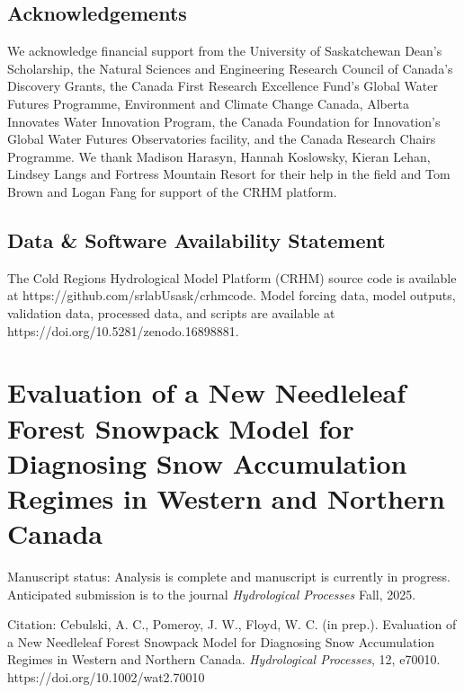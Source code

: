 \documentclass[
  letterpaper,
]{tex/uofsthesis-cs}
\begin{document}
\section{Acknowledgements}\label{acknowledgements}

We acknowledge financial support from the University of Saskatchewan
Dean's Scholarship, the Natural Sciences and Engineering Research
Council of Canada's Discovery Grants, the Canada First Research
Excellence Fund's Global Water Futures Programme, Environment and
Climate Change Canada, Alberta Innovates Water Innovation Program, the
Canada Foundation for Innovation's Global Water Futures Observatories
facility, and the Canada Research Chairs Programme. We thank Madison
Harasyn, Hannah Koslowsky, Kieran Lehan, Lindsey Langs and Fortress
Mountain Resort for their help in the field and Tom Brown and Logan Fang
for support of the CRHM platform.

\section{Data \& Software Availability
Statement}\label{data-software-availability-statement}

The Cold Regions Hydrological Model Platform (CRHM) source code is
available at https://github.com/srlabUsask/crhmcode. Model forcing data,
model outputs, validation data, processed data, and scripts are
available at https://doi.org/10.5281/zenodo.16898881.

\pagebreak


\chapter{Evaluation of a New Needleleaf Forest Snowpack Model for
Diagnosing Snow Accumulation Regimes in Western and Northern
Canada}\label{evaluation-of-a-new-needleleaf-forest-snowpack-model-for-diagnosing-snow-accumulation-regimes-in-western-and-northern-canada}

Manuscript status: Analysis is complete and manuscript is currently in
progress. Anticipated submission is to the journal \emph{Hydrological
Processes} Fall, 2025.

Citation: Cebulski, A. C., Pomeroy, J. W., Floyd, W. C. (in prep.).
Evaluation of a New Needleleaf Forest Snowpack Model for Diagnosing Snow
Accumulation Regimes in Western and Northern Canada. \emph{Hydrological
Processes}, 12, e70010. https://doi.org/10.1002/wat2.70010
\end{document}
